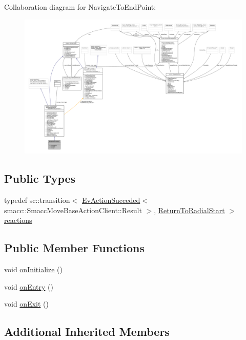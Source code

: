 Collaboration diagram for Navigate\+To\+End\+Point\+:
\nopagebreak
\begin{figure}[H]
\begin{center}
\leavevmode
\includegraphics[width=350pt]{structNavigateToEndPoint__coll__graph}
\end{center}
\end{figure}
\subsection*{Public Types}
\begin{DoxyCompactItemize}
\item 
typedef sc\+::transition$<$ \hyperlink{structsmacc_1_1EvActionSucceded}{Ev\+Action\+Succeded}$<$ smacc\+::\+Smacc\+Move\+Base\+Action\+Client\+::\+Result $>$, \hyperlink{structReturnToRadialStart}{Return\+To\+Radial\+Start} $>$ \hyperlink{structNavigateToEndPoint_ae73c001eca6e7ec3203cd92c1f0e0302}{reactions}
\end{DoxyCompactItemize}
\subsection*{Public Member Functions}
\begin{DoxyCompactItemize}
\item 
void \hyperlink{structNavigateToEndPoint_a49bbb5a925e7479bcffada2d0fd22716}{on\+Initialize} ()
\item 
void \hyperlink{structNavigateToEndPoint_af483b7482520fc49208e1c8a219cd518}{on\+Entry} ()
\item 
void \hyperlink{structNavigateToEndPoint_a49935d50bb7c9f5a01c619eef549360b}{on\+Exit} ()
\end{DoxyCompactItemize}
\subsection*{Additional Inherited Members}


